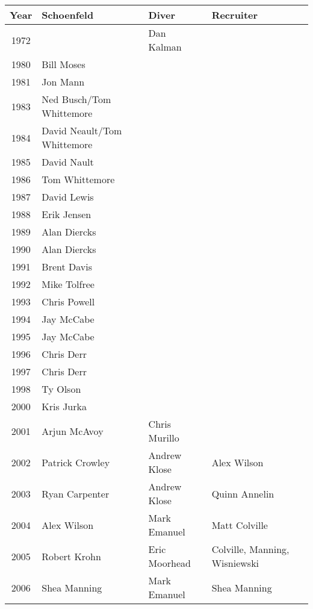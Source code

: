         
        \begin{table}[htbp]
            \centering
            \scriptsize
            \begin{tabular}{c l l l}
            \toprule
            Year & Schoenfeld & Diver & Recruiter \\
            \midrule
            1972 &  & Dan Kalman &  \\
            1980 & Bill Moses &  &  \\
            1981 & Jon Mann &  &  \\
            1983 & Ned Busch/Tom Whittemore &  &  \\
            1984 & David Neault/Tom Whittemore &  &  \\
            1985 & David Nault &  &  \\
            1986 & Tom Whittemore &  &  \\
            1987 & David Lewis &  &  \\
            1988 & Erik Jensen &  &  \\
            1989 & Alan Diercks &  &  \\
            1990 & Alan Diercks &  &  \\
            1991 & Brent Davis &  &  \\
            1992 & Mike Tolfree &  &  \\
            1993 & Chris Powell &  &  \\
            1994 & Jay McCabe &  &  \\
            1995 & Jay McCabe &  &  \\
            1996 & Chris Derr &  &  \\
            1997 & Chris Derr &  &  \\
            1998 & Ty Olson &  &  \\
            2000 & Kris Jurka &  &  \\
            2001 & Arjun McAvoy & Chris Murillo &  \\
            2002 & Patrick Crowley & Andrew Klose & Alex Wilson \\
            2003 & Ryan Carpenter & Andrew Klose & Quinn Annelin \\
            2004 & Alex Wilson & Mark Emanuel & Matt Colville \\
            2005 & Robert Krohn & Eric Moorhead & Colville, Manning, Wisniewski \\
            2006 & Shea Manning & Mark Emanuel & Shea Manning \\

\end{tabular}
\end{table}
